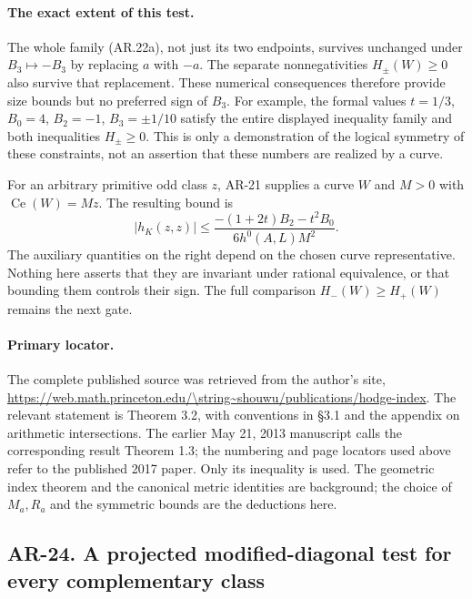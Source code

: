 \documentclass[11pt,a4paper]{article}
\begin{document}
\paragraph{The exact extent of this test.}
The whole family (AR.22a), not just its two endpoints, survives
unchanged under $B_3\mapsto-B_3$ by replacing $a$ with $-a$.
The separate nonnegativities $H_\pm(W)\ge0$ also survive that
replacement.  These numerical consequences therefore provide size
bounds but no preferred sign of $B_3$.  For example, the formal
values $t=1/3$, $B_0=4$, $B_2=-1$, $B_3=\pm1/10$ satisfy the
entire displayed inequality family and both inequalities
$H_\pm\ge0$.  This is only a demonstration of the logical symmetry
of these constraints, not an assertion that these numbers are
realized by a curve.

For an arbitrary primitive odd class $z$, AR-21 supplies a curve
$W$ and $M>0$ with $\operatorname{Ce}(W)=Mz$.  The resulting bound
is
\[
 |h_K(z,z)|\le
 \frac{-(1+2t)B_2-t^2B_0}{6h^0(A,L)M^2}.          \tag{AR.22e}
\]
The auxiliary quantities on the right depend on the chosen curve
representative.  Nothing here asserts that they are invariant under
rational equivalence, or that bounding them controls their sign.
The full comparison $H_-(W)\ge H_+(W)$ remains the next gate.

\paragraph{Primary locator.}
The complete published source was retrieved from the author's site,
\url{https://web.math.princeton.edu/\string~shouwu/publications/hodge-index}.
The relevant statement is Theorem 3.2, with conventions in
\S3.1 and the appendix on arithmetic intersections.  The earlier
May 21, 2013 manuscript calls the corresponding result Theorem 1.3;
the numbering and page locators used above refer to the published
2017 paper.  Only its inequality is used.  The geometric index
theorem and the canonical metric identities are background; the
choice of $M_a,R_a$ and the symmetric bounds are the deductions here.
\subsection*{AR-24. A projected modified-diagonal test for every complementary class}
\end{document}
